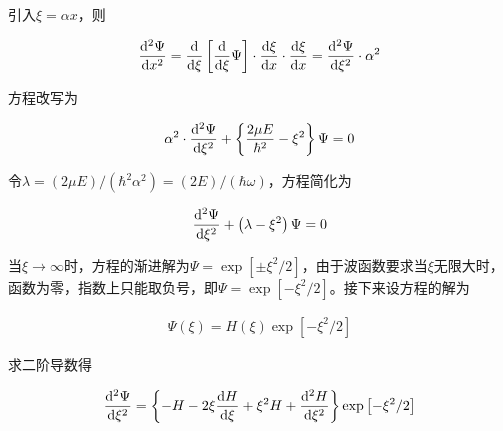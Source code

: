 引入$\xi=\alpha x$，则

\begin{equation*}
  \begin{aligned}
    \dfrac{\md^2 \Psi}{\md x^2} = \dfrac{\md}{\md \xi} \left[ \dfrac{\md}{\md \xi} \Psi \right] \cdot \dfrac{\md \xi}{\md x} \cdot \dfrac{\md \xi}{\md x} = \dfrac{\md^2 \Psi}{\md \xi^2} \cdot \alpha^2 
  \end{aligned}
\end{equation*}

方程改写为

\begin{equation*}
  \begin{aligned}
    \alpha^2 \cdot \dfrac{\mathop{}\!\mathrm{d}^2 \Psi}{\mathop{}\!\mathrm{d} \xi^2} + \left\{ \dfrac{2 \mu E}{\hbar^2} - \xi^2  \right\} \Psi = 0 
  \end{aligned}
\end{equation*}

令$\lambda = \left( 2 \mu E \right) / \left( \hbar^2 \alpha^2 \right) = \left( 2 E \right) / \left( \hbar \omega \right)$，方程简化为

\begin{equation}
  \label{eq:简化后的谐振子}
  \begin{aligned}
    \dfrac{\mathop{}\!\mathrm{d}^2 \Psi}{\mathop{}\!\mathrm{d} \xi^2} + \left( \lambda - \xi^2 \right) \Psi = 0 
  \end{aligned}
\end{equation}

当$\xi \rightarrow \infty$时，方程的渐进解为$\Psi = \exp \left[ \pm \xi^2 / 2  \right]$，由于波函数要求当$\xi$无限大时，函数为零，指数上只能取负号，即$\Psi = \exp \left[ - \xi^2/ 2  \right]$。接下来设方程的解为

\begin{equation*}
  \begin{aligned}
    \Psi \left( \xi \right) = H \left( \xi \right) \exp \left[ - \xi^2 / 2 \right]
  \end{aligned}
\end{equation*}

求二阶导数得

\begin{equation*}
  \begin{aligned}
    \dfrac{\mathop{}\!\mathrm{d}^2 \Psi}{\mathop{}\!\mathrm{d} \xi^2} = \left\{ - H - 2 \xi \dfrac{\mathop{}\!\mathrm{d} H}{\mathop{}\!\mathrm{d} \xi} + \xi^2 H + \dfrac{\mathop{}\!\mathrm{d}^2 H}{\mathop{}\!\mathrm{d} \xi^2}   \right\} \exp \left[ - \xi^2 / 2 \right] 
  \end{aligned}
\end{equation*}

